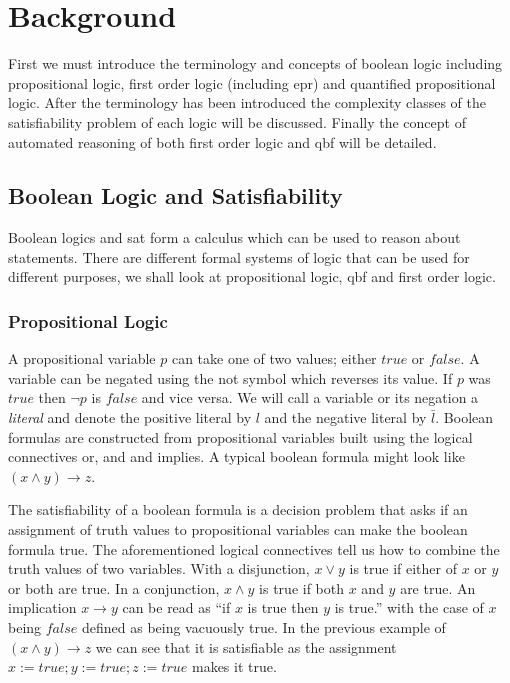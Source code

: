 \chapter{Background}
First we must introduce the terminology and concepts of boolean logic including propositional logic, first order logic (including \gls{epr}) and quantified propositional logic.
After the terminology has been introduced the complexity classes of the satisfiability problem of each logic will be discussed.
Finally the concept of automated reasoning of both first order logic and \gls{qbf} will be detailed.

\section{Boolean Logic and Satisfiability}
Boolean logics and \gls{sat} form a calculus which can be used to reason about statements. There are different formal systems of logic that can be used for different purposes, we shall look at propositional logic, \gls{qbf} and first order logic.

\subsection{Propositional Logic}
A propositional variable $p$ can take one of two values; either $true$ or $false$. A variable can be negated using the \gls{not} symbol which reverses its value. If $p$ was $true$ then $\neg p$ is $false$ and vice versa. We will call a variable or its negation a \textit{literal} and denote the positive literal by $l$ and the negative literal by $\bar{l}$.
Boolean formulas are constructed from propositional variables built using the logical connectives \gls{or}, \gls{and} and \gls{implies}. A typical boolean formula might look like $(x \land y) \to z$. 

The satisfiability of a boolean formula is a decision problem that asks if an assignment of truth values to propositional variables can make the boolean formula true. The aforementioned logical connectives tell us how to combine the truth values of two variables. With a disjunction, $x \lor y$ is true if either of $x$ or $y$ or both are true. In a conjunction, $x \land y$ is true if both $x$ and $y$ are true. An implication $x \to y$ can be read as ``if $x$ is true then $y$ is true.'' with the case of $x$ being $false$ defined as being vacuously true. In the previous example of $(x \land y) \to z$ we can see that it is satisfiable as the assignment $x := true; y := true; z := true$ makes it true.

